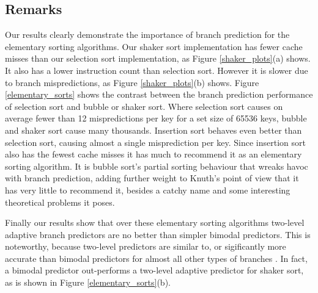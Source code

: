 \documentclass[acmtocl]{acmtrans2m}
\begin{document}
\subsection{Remarks}

Our results clearly demonstrate the importance of branch prediction for the
elementary sorting algorithms.  Our shaker sort implementation has fewer cache
misses than our selection sort implementation, as Figure \ref{shaker_plots}(a)
shows.  It also has a lower instruction count than selection sort. However it is
slower due to branch mispredictions, as Figure \ref{shaker_plots}(b) shows.
Figure \ref{elementary_sorts} shows the contrast between the branch prediction
performance of selection sort and bubble or shaker sort. Where selection sort
causes on average fewer than 12 mispredictions per key for a set size of 65536
keys, bubble and shaker sort cause many thousands.  Insertion sort behaves even
better than selection sort, causing almost a single misprediction per key. Since
insertion sort also has the fewest cache misses it has much to recommend it as
an elementary sorting algorithm. It is bubble sort's partial sorting behaviour
that wreaks havoc with branch prediction, adding further weight to Knuth's
\citeyear{KnuthVol3_98} point of view that it has very little to recommend it,
besides a catchy name and some interesting theoretical problems it poses. 

Finally our results show that over these elementary sorting algorithms two-level
adaptive branch predictors are no better than simpler bimodal predictors.  This
is noteworthy, because two-level predictors are similar to, or sigificantly more
accurate than bimodal predictors for almost all other types of branches
\cite{Uht+97}.  In fact, a bimodal predictor out-performs a two-level adaptive
predictor for shaker sort, as is shown in Figure \ref{elementary_sorts}(b).
\end{document}
